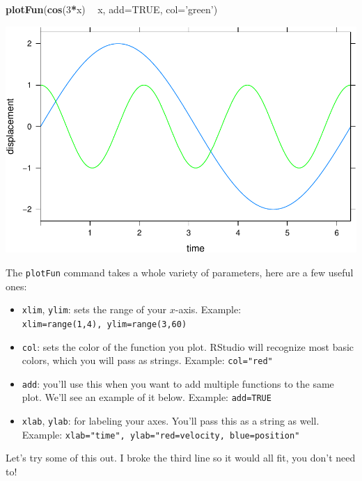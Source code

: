 \documentclass[
]{book}
\newenvironment{Shaded}{\begin{snugshade}}{\end{snugshade}}
\newcommand{\DataTypeTok}[1]{\textcolor[rgb]{0.13,0.29,0.53}{#1}}
\newcommand{\DecValTok}[1]{\textcolor[rgb]{0.00,0.00,0.81}{#1}}
\newcommand{\KeywordTok}[1]{\textcolor[rgb]{0.13,0.29,0.53}{\textbf{#1}}}
\newcommand{\NormalTok}[1]{#1}
\newcommand{\OperatorTok}[1]{\textcolor[rgb]{0.81,0.36,0.00}{\textbf{#1}}}
\newcommand{\OtherTok}[1]{\textcolor[rgb]{0.56,0.35,0.01}{#1}}
\newcommand{\StringTok}[1]{\textcolor[rgb]{0.31,0.60,0.02}{#1}}
\providecommand{\tightlist}{%
  \setlength{\itemsep}{0pt}\setlength{\parskip}{0pt}}
\begin{document}
\begin{Shaded}
\begin{Highlighting}[]
\KeywordTok{plotFun}\NormalTok{(}\KeywordTok{cos}\NormalTok{(}\DecValTok{3}\OperatorTok{*}\NormalTok{x) }\OperatorTok{~}\StringTok{ }\NormalTok{x, }\DataTypeTok{add=}\OtherTok{TRUE}\NormalTok{, }\DataTypeTok{col=}\StringTok{'green'}\NormalTok{)}
\end{Highlighting}
\end{Shaded}

\includegraphics{_bookdown_files/math135_handbook_files/figure-latex/unnamed-chunk-32-2.pdf}

The \texttt{plotFun} command takes a whole variety of parameters, here are a few useful ones:

\begin{itemize}
\tightlist
\item
  \texttt{xlim}, \texttt{ylim}: sets the range of your \(x\)-axis. Example: \texttt{xlim=range(1,4),\ ylim=range(3,60)}
\item
  \texttt{col}: sets the color of the function you plot. RStudio will recognize most basic colors, which you will pass as strings. Example: \texttt{col="red"}
\item
  \texttt{add}: you'll use this when you want to add multiple functions to the same plot. We'll see an example of it below.
  Example: \texttt{add=TRUE}
\item
  \texttt{xlab}, \texttt{ylab}: for labeling your axes. You'll pass this as a string as well. Example: \texttt{xlab="time",\ ylab="red=velocity,\ blue=position"}
\end{itemize}

Let's try some of this out. I broke the third line so it would all fit, you don't need to!
\end{document}

